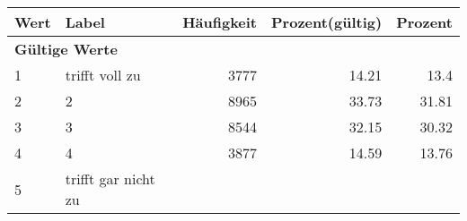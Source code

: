      \begin{longtable}{lXrrr}
     \toprule
     \textbf{Wert} & \textbf{Label} & \textbf{Häufigkeit} & \textbf{Prozent(gültig)} & \textbf{Prozent} \\
     \endhead
     \midrule
     \multicolumn{5}{l}{\textbf{Gültige Werte}}\\

     1 &
     \multicolumn{1}{X}{ trifft voll zu   } &


       \num{3777} &
       \num[round-mode=places,round-precision=2]{14.21} &
         \num[round-mode=places,round-precision=2]{13.4} \\

     2 &
     \multicolumn{1}{X}{ 2   } &


       \num{8965} &
       \num[round-mode=places,round-precision=2]{33.73} &
         \num[round-mode=places,round-precision=2]{31.81} \\

     3 &
     \multicolumn{1}{X}{ 3   } &


       \num{8544} &
       \num[round-mode=places,round-precision=2]{32.15} &
         \num[round-mode=places,round-precision=2]{30.32} \\

     4 &
     \multicolumn{1}{X}{ 4   } &


       \num{3877} &
       \num[round-mode=places,round-precision=2]{14.59} &
         \num[round-mode=places,round-precision=2]{13.76} \\

     5 &
     \multicolumn{1}{X}{ trifft gar nicht zu   } &



\end{longtable}
